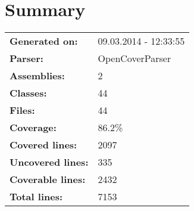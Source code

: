 \documentclass[a4paper,10pt]{article}
\begin{document}
\setcounter{secnumdepth}{-1}
\section{Summary}
\begin{longtable}[l]{ll}
\textbf{Generated on:} & 09.03.2014 - 12:33:55\\
\textbf{Parser:} & OpenCoverParser\\
\textbf{Assemblies:} & 2\\
\textbf{Classes:} & 44\\
\textbf{Files:} & 44\\
\textbf{Coverage:} & 86.2\%\\
\textbf{Covered lines:} & 2097\\
\textbf{Uncovered lines:} & 335\\
\textbf{Coverable lines:} & 2432\\
\textbf{Total lines:} & 7153\\
\end{longtable}
\end{document}
